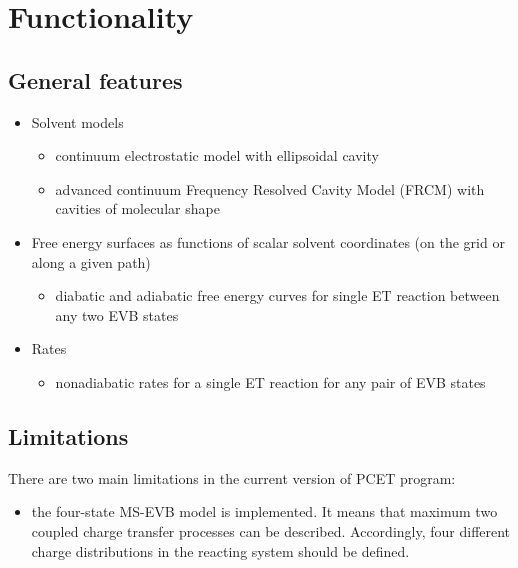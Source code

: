 \documentclass[oneside,11pt,openany]{book}
\begin{document}
\section{Functionality}

\subsection{General features}

\begin{itemize}

\item Solvent models
\begin{itemize}
\item continuum electrostatic model with ellipsoidal cavity
      \cite{Kirkwood38}
\item advanced continuum Frequency Resolved Cavity Model (FRCM)
      with cavities of molecular shape \cite{Rostov-1}
\end{itemize}

\item Free energy surfaces as functions of scalar solvent
      coordinates (on the grid or along a given path)
\begin{itemize}
\item diabatic and adiabatic free energy curves for single ET
      reaction between any two EVB states
\end{itemize}

\item Rates
\begin{itemize}
\item nonadiabatic rates for a single ET reaction for
      any pair of EVB states
\end{itemize}

\end{itemize}

\subsection{Limitations}

There are two main limitations in the current version of PCET
program:
\begin{itemize}
\item the four-state MS-EVB model is implemented. It means that
      maximum two coupled charge transfer processes can be
      described. Accordingly, four different charge
      distributions in the reacting system should be defined.
\end{itemize}
\end{document}
